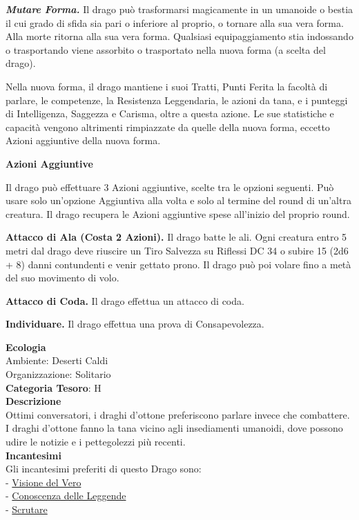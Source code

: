 \begin{multicols}{2}
{\emph{\textbf{Mutare Forma.}} Il drago può trasformarsi magicamente in un umanoide o bestia il cui grado di sfida sia pari o inferiore al proprio, o tornare alla sua vera forma. Alla morte ritorna alla sua vera forma. Qualsiasi equipaggiamento stia indossando o trasportando viene assorbito o trasportato nella nuova forma (a scelta del drago).

Nella nuova forma, il drago mantiene i suoi Tratti, Punti Ferita la facoltà di parlare, le competenze, la Resistenza Leggendaria, le azioni da tana, e i punteggi di Intelligenza, Saggezza e Carisma, oltre a questa azione. Le sue statistiche e capacità vengono altrimenti rimpiazzate da quelle della nuova forma, eccetto Azioni aggiuntive della nuova forma.

\textbf{Azioni Aggiuntive}

Il drago può effettuare 3 Azioni aggiuntive, scelte tra le opzioni seguenti. Può usare solo un'opzione Aggiuntiva alla volta e solo al termine del round di un'altra creatura. Il drago recupera le Azioni aggiuntive spese all'inizio del proprio round.

\textbf{Attacco di Ala (Costa 2 Azioni).} Il drago batte le ali. Ogni creatura entro 5 metri dal drago deve riuscire un Tiro Salvezza su Riflessi DC 34 o subire 15 (2d6 + 8) danni contundenti e venir gettato prono. Il drago può poi volare fino a metà del suo movimento di volo.

\textbf{Attacco di Coda.} Il drago effettua un attacco di coda.

\textbf{Individuare.} Il drago effettua una prova di Consapevolezza.

\textbf{Ecologia}\\
Ambiente: Deserti Caldi\\
Organizzazione: Solitario\\
\textbf{Categoria Tesoro}: H\\
\textbf{Descrizione}\\
Ottimi conversatori, i draghi d'ottone preferiscono parlare invece che combattere. I draghi d'ottone fanno la tana vicino agli insediamenti umanoidi, dove possono udire le notizie e i pettegolezzi più recenti.\\
\textbf{Incantesimi}\\
Gli incantesimi preferiti di questo Drago sono:\\
- \hyperlink{Visione del Vero}{Visione del Vero}\\
- \hyperlink{Conoscenza delle Leggende}{Conoscenza delle Leggende}\\
- \hyperlink{Scrutare}{Scrutare}

}
\end{multicols}

